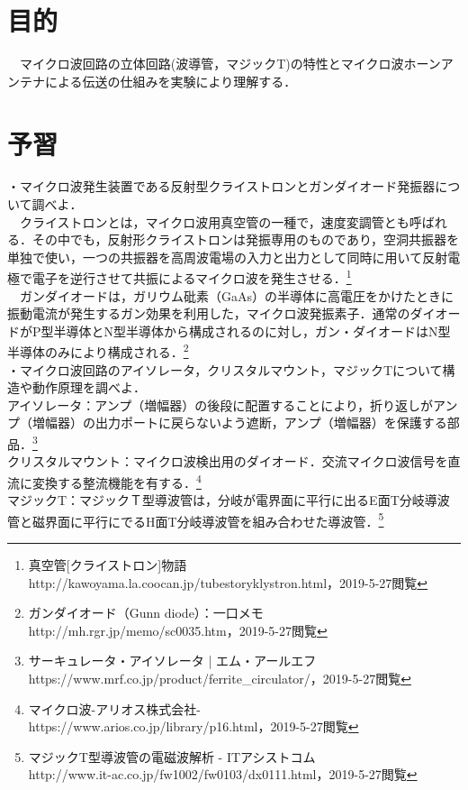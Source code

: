 

\pagestyle{fancy}

\section{目的}
　マイクロ波回路の立体回路(波導管，マジックT)の特性とマイクロ波ホーンアンテナによる伝送の仕組みを実験により理解する．

\section{予習}
・マイクロ波発生装置である反射型クライストロンとガンダイオード発振器について調べよ．\\
　クライストロンとは，マイクロ波用真空管の一種で，速度変調管とも呼ばれる．その中でも，反射形クライストロンは発振専用のものであり，空洞共振器を単独で使い，一つの共振器を高周波電場の入力と出力として同時に用いて反射電極で電子を逆行させて共振によるマイクロ波を発生させる．\footnote{真空管[クライストロン]物語\\http://kawoyama.la.coocan.jp/tubestoryklystron.html，2019-5-27閲覧}\\
　ガンダイオードは，ガリウム砒素（GaAs）の半導体に高電圧をかけたときに振動電流が発生するガン効果を利用した，マイクロ波発振素子．通常のダイオードがP型半導体とN型半導体から構成されるのに対し，ガン・ダイオードはN型半導体のみにより構成される．\footnote{ガンダイオード（Gunn diode）：一口メモ\\http://mh.rgr.jp/memo/sc0035.htm，2019-5-27閲覧}\\

・マイクロ波回路のアイソレータ，クリスタルマウント，マジックTについて構造や動作原理を調べよ．\\
アイソレータ：アンプ（増幅器）の後段に配置することにより，折り返しがアンプ（増幅器）の出力ポートに戻らないよう遮断，アンプ（増幅器）を保護する部品．\footnote{サーキュレータ・アイソレータ | エム・アールエフ\\https://www.mrf.co.jp/product/ferrite\_circulator/，2019-5-27閲覧}\\
クリスタルマウント：マイクロ波検出用のダイオード．交流マイクロ波信号を直流に変換する整流機能を有する．\footnote{マイクロ波-アリオス株式会社-\\https://www.arios.co.jp/library/p16.html，2019-5-27閲覧}\\
マジックT：マジックＴ型導波管は，分岐が電界面に平行に出るE面T分岐導波管と磁界面に平行にでるH面T分岐導波管を組み合わせた導波管．\footnote{マジックT型導波管の電磁波解析 - ITアシストコム\\http://www.it-ac.co.jp/fw1002/fw0103/dx0111.html，2019-5-27閲覧}\\

